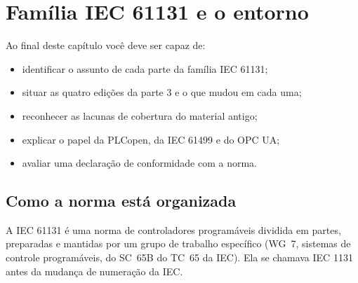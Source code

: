 \chapter{Família IEC 61131 e o entorno}
\label{cap:familia-iec}

\begin{objetivos}
Ao final deste capítulo você deve ser capaz de:
\begin{itemize}
  \item identificar o assunto de cada parte da família IEC 61131;
  \item situar as quatro edições da parte 3 e o que mudou em cada uma;
  \item reconhecer as lacunas de cobertura do material antigo;
  \item explicar o papel da PLCopen, da IEC 61499 e do OPC UA;
  \item avaliar uma declaração de conformidade com a norma.
\end{itemize}
\end{objetivos}

\section{Como a norma está organizada}

A IEC 61131 é uma norma de controladores programáveis dividida em partes, preparadas e mantidas por
um grupo de trabalho específico (WG~7, sistemas de controle programáveis, do SC~65B do TC~65 da
IEC). Ela se chamava IEC 1131 antes da mudança de numeração da IEC.

